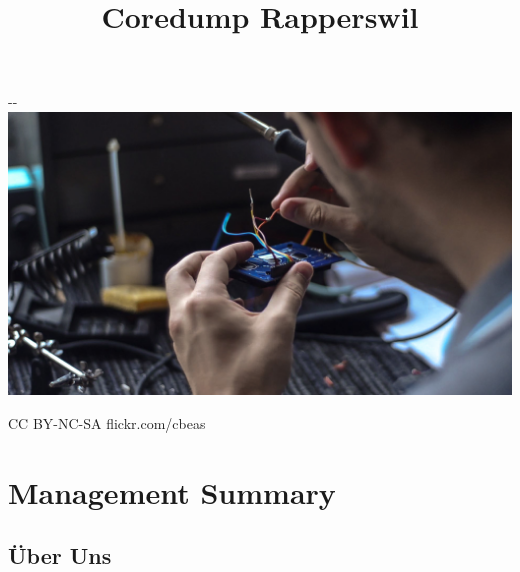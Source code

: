 \documentclass[10pt,a4paper,parskip,fleqn]{scrartcl}
\title{\Huge Coredump Rapperswil}
\begin{document}
\begin{titlepage}

	\maketitle

	\vspace{2cm}

	\begin{adjustwidth}{-\oddsidemargin-1in}{-\rightmargin-1in}
		\includegraphics[width=\paperwidth]{soldering.jpg}

		\vspace{-12mm}

		\hfill {\scriptsize \color{light-gray} CC BY-NC-SA flickr.com/cbeas}
	\end{adjustwidth}

	\vfill

\end{titlepage}

\section{Management Summary}

\subsection{Über Uns}
\end{document}
